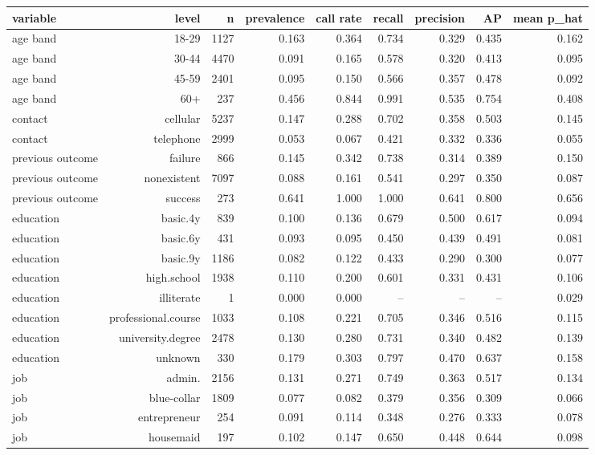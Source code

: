 \begin{tabular}{lrrrrrrrr}
\toprule
variable & level & n & prevalence & call rate & recall & precision & AP & mean p\_hat \\
\midrule
age band & 18-29 & 1127 & 0.163 & 0.364 & 0.734 & 0.329 & 0.435 & 0.162 \\
age band & 30-44 & 4470 & 0.091 & 0.165 & 0.578 & 0.320 & 0.413 & 0.095 \\
age band & 45-59 & 2401 & 0.095 & 0.150 & 0.566 & 0.357 & 0.478 & 0.092 \\
age band & 60+ & 237 & 0.456 & 0.844 & 0.991 & 0.535 & 0.754 & 0.408 \\
contact & cellular & 5237 & 0.147 & 0.288 & 0.702 & 0.358 & 0.503 & 0.145 \\
contact & telephone & 2999 & 0.053 & 0.067 & 0.421 & 0.332 & 0.336 & 0.055 \\
previous outcome & failure & 866 & 0.145 & 0.342 & 0.738 & 0.314 & 0.389 & 0.150 \\
previous outcome & nonexistent & 7097 & 0.088 & 0.161 & 0.541 & 0.297 & 0.350 & 0.087 \\
previous outcome & success & 273 & 0.641 & 1.000 & 1.000 & 0.641 & 0.800 & 0.656 \\
education & basic.4y & 839 & 0.100 & 0.136 & 0.679 & 0.500 & 0.617 & 0.094 \\
education & basic.6y & 431 & 0.093 & 0.095 & 0.450 & 0.439 & 0.491 & 0.081 \\
education & basic.9y & 1186 & 0.082 & 0.122 & 0.433 & 0.290 & 0.300 & 0.077 \\
education & high.school & 1938 & 0.110 & 0.200 & 0.601 & 0.331 & 0.431 & 0.106 \\
education & illiterate & 1 & 0.000 & 0.000 & -- & -- & -- & 0.029 \\
education & professional.course & 1033 & 0.108 & 0.221 & 0.705 & 0.346 & 0.516 & 0.115 \\
education & university.degree & 2478 & 0.130 & 0.280 & 0.731 & 0.340 & 0.482 & 0.139 \\
education & unknown & 330 & 0.179 & 0.303 & 0.797 & 0.470 & 0.637 & 0.158 \\
job & admin. & 2156 & 0.131 & 0.271 & 0.749 & 0.363 & 0.517 & 0.134 \\
job & blue-collar & 1809 & 0.077 & 0.082 & 0.379 & 0.356 & 0.309 & 0.066 \\
job & entrepreneur & 254 & 0.091 & 0.114 & 0.348 & 0.276 & 0.333 & 0.078 \\
job & housemaid & 197 & 0.102 & 0.147 & 0.650 & 0.448 & 0.644 & 0.098 \\

\end{tabular}

